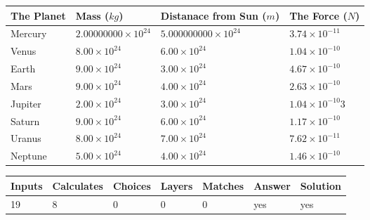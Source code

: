 \documentclass[12pt]{article}
\begin{document}
\vspace{0.2in}
 
 
\begin{tabular}{|l|l|l|l|}
\hline
The Planet & Mass ($kg$) & Distanace from Sun ($m$) & The Force ($N$)\\
\hline
Mercury  &
           $ %
2.00000000 \times 10^{24}  $   &
             $ %
5.000000000 \times 10^{24}$    & $ %
3.74 \times 10^{-11} $
\\  \hline
Venus    &
           $  %
8.00 \times 10^{24}  $     &
             $ %
6.00 \times 10^{24} $    & $ %
1.04 \times 10^{-10} $
\\  \hline
Earth    &
           $  %
9.00 \times 10^{24}$     &
             $ %
3.00 \times 10^{24} $    & $ %
4.67 \times 10^{-10} $
\\   \hline
Mars     &
           $  %
9.00 \times 10^{24} $     &
             $ %
4.00 \times 10^{24}$    & $ %
2.63 \times 10^{-10} $
\\   \hline
Jupiter  &
           $  %
2.00 \times 10^{24}  $    &
             $ %
3.00 \times 10^{24} $    & $ %
1.04 \times 10^{-10}3 $
\\  \hline
Saturn   &
           $  %
9.00 \times 10^{24}   $    &
             $ %
6.00 \times 10^{24}  $    & $ %
1.17 \times 10^{-10} $
\\  \hline
Uranus   &
           $  %
8.00 \times 10^{24} $    &
             $ %
7.00 \times 10^{24}$    & $ %
7.62 \times 10^{-11} $
\\  \hline
Neptune  &
           $  %
5.00 \times 10^{24}  $    &
             $ %
4.00 \times 10^{24} $    & $ %
1.46 \times 10^{-10} $
\\  \hline
 
\end{tabular}
 
 
 
 
\noindent{}
 
 

 
\vspace{0.3in}
   
   
   
   
\noindent\begin{tabular}{|l|l|l|l|l|l|l|}
 \hline
Inputs & Calculates & Choices & Layers & Matches & Answer & Solution \\ \hline
          19  & 
           8  & 
           0
  & 
           0  & 
           0  & 
  yes & 
  yes 
  \\ \hline
 \end{tabular}
   
\end{document}
